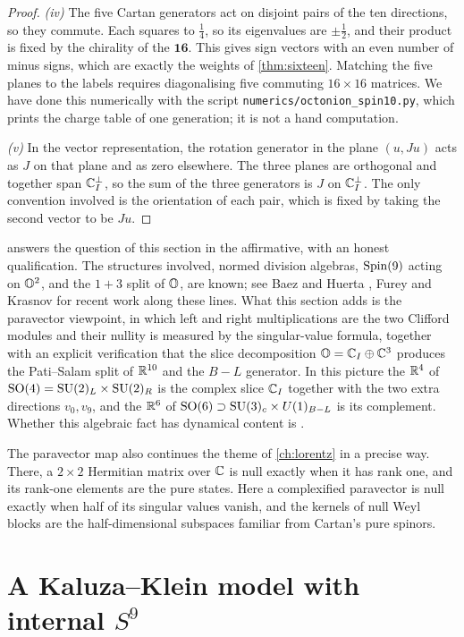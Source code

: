 \begin{proof}
\emph{(iv)} The five Cartan generators act on disjoint pairs of the ten directions, so they commute. Each squares to $\frac14$, so its eigenvalues are $\pm\frac12$, and their product is fixed by the chirality of the $\mathbf{16}$. This gives sign vectors with an even number of minus signs, which are exactly the weights of \cref{thm:sixteen}. Matching the five planes to the labels requires diagonalising five commuting $16\times16$ matrices. We have done this numerically with the script \texttt{numerics/octonion\_spin10.py}, which prints the charge table of one generation; it is not a hand computation.

\emph{(v)} In the vector representation, the rotation generator in the plane $(u,Ju)$ acts as $J$ on that plane and as zero elsewhere. The three planes are orthogonal and together span $\mathbb{C}_I^\perp$, so the sum of the three generators is $J$ on $\mathbb{C}_I^\perp$. The only convention involved is the orientation of each pair, which is fixed by taking the second vector to be $Ju$.
\end{proof}


 answers the question of this section in the affirmative, with an honest qualification. The structures involved, normed division algebras, $\mathrm{Spin}(9)$ acting on $\mathbb{O}^2$, and the $1+3$ split of $\mathbb{O}$, are known; see Baez and Huerta \cite{BaezHuerta2010}, Furey \cite{Furey2016} and Krasnov \cite{Krasnov2021} for recent work along these lines. What this section adds is the paravector viewpoint, in which left and right multiplications are the two Clifford modules and their nullity is measured by the singular-value formula, together with an explicit verification that the slice decomposition $\mathbb{O}=\mathbb{C}_I\oplus\mathbb{C}^3$ produces the Pati--Salam split of $\mathbb{R}^{10}$ and the $B-L$ generator. In this picture the $\mathbb{R}^4$ of $\mathrm{SO}(4)=\mathrm{SU}(2)_L\times\mathrm{SU}(2)_R$ is the complex slice $\mathbb{C}_I$ together with the two extra directions $v_0,v_9$, and the $\mathbb{R}^6$ of $\mathrm{SO}(6)\supset\mathrm{SU}(3)_c\times U(1)_{B-L}$ is its complement. Whether this algebraic fact has dynamical content is \opn.

The paravector map also continues the theme of \cref{ch:lorentz} in a precise way. There, a $2\times2$ Hermitian matrix over $\mathbb{C}$ is null exactly when it has rank one, and its rank-one elements are the pure states. Here a complexified paravector is null exactly when half of its singular values vanish, and the kernels of null Weyl blocks are the half-dimensional subspaces familiar from Cartan's pure spinors.

\section{A Kaluza--Klein model with internal \texorpdfstring{$S^9$}{S9}}

